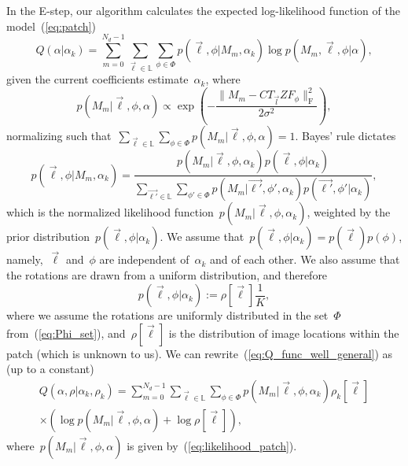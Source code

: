\documentclass{article}
\begin{document}
In the E-step, our algorithm calculates the expected log-likelihood function of the model~(\ref{eq:patch})
\begin{equation}
\label{eq:Q_func_well_general}
Q(\alpha|\alpha_k) = \sum_{m = 0}^{N_d - 1} \sum_{\vec{\ell} \in \mathbb{L}} \sum_{\phi \in \Phi} p(\vec{\ell}, \phi|M_m, \alpha_k) \log p(M_m, \vec{\ell}, \phi|\alpha),
\end{equation}
given the current coefficients estimate~$\alpha_k$, where
\begin{equation}
\label{eq:likelihood_patch}
p(M_m|\vec{\ell}, \phi, \alpha) \propto \exp \left(- \frac{\|M_m - C T_{\vec{l}} Z F_{\phi}\|_\text{F}^2}{2 \sigma^2} \right),
\end{equation}
normalizing such that~\mbox{$\sum_{\vec{\ell} \in \mathbb{L}} \sum_{\phi \in \Phi} p(M_m|\vec{\ell}, \phi, \alpha) = 1$}. Bayes' rule dictates
\begin{equation}
\label{eq:pM_l_phi_alpha}
p(\vec{\ell}, \phi|M_m, \alpha_k) = \frac{p(M_m|\vec{\ell}, \phi, \alpha_k) p(\vec{\ell}, \phi|\alpha_k)}{\sum_{\vec{\ell'} \in \mathbb{L}} \sum_{\phi' \in \Phi} p(M_m|\vec{\ell'}, \phi', \alpha_k) p(\vec{\ell'}, \phi'|\alpha_k)},
\end{equation}
which is the normalized likelihood function~$p(M_m|\vec{\ell}, \phi, \alpha_k)$, weighted by the prior distribution~$p(\vec{\ell}, \phi| \alpha_k)$. We assume that~$p(\vec{\ell},\phi|\alpha_k)=p(\vec{\ell})p(\phi)$, namely,~$\vec{\ell}$ and~$\phi$ are independent of~$\alpha_k$ and of each other. We also assume that the rotations are drawn from a uniform distribution, and therefore
\begin{equation}
p(\vec{\ell}, \phi|\alpha_k) := \rho[\vec{\ell}] \frac{1}{K},
\end{equation}
where we assume the rotations are uniformly distributed in the set~$\Phi$ from~(\ref{eq:Phi_set}), and~$\rho[\vec{\ell}]$ is the distribution of image locations within the patch (which is unknown to us). We can rewrite~(\ref{eq:Q_func_well_general}) as (up to a constant)
\begin{multline}
Q(\alpha, \rho|\alpha_k, \rho_k) = \sum_{m = 0}^{N_d - 1} \sum_{\vec{\ell} \in \mathbb{L}} \sum_{\phi \in \Phi} p(M_m|\vec{\ell}, \phi, \alpha_k) \rho_k[\vec{\ell}] \\ \times \left(\log p(M_m|\vec{\ell}, \phi, \alpha) + \log \rho[\vec{\ell}]\right),
\end{multline}
where~$p(M_m|\vec{\ell}, \phi, \alpha)$ is given by~(\ref{eq:likelihood_patch}).
\end{document}
